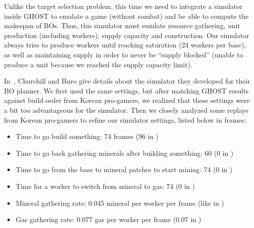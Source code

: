 \documentclass[journal]{IEEEtran}
\newcommand{\ghost}{\textsc{GHOST}\xspace}
\newcommand{\ie}{\textit{i.e.}}
\begin{document}
Unlike the target selection problem, this time  we need to integrate
a simulator inside  \ghost to emulate a game (without  combat) and be
able to  compute the  makespan of BOs. Thus,  this simulator
must emulate resource gathering, unit production (including workers),
supply capacity and construction.  Our simulator always tries to
produce workers  until reaching saturation  (24 workers per  base), as
well as  maintaining supply in  order to never be  ``supply blocked'' (unable  to  produce a  unit because  we  reached the  supply
capacity limit).

In~\cite{ChurchillB11},  Churchill and  Buro  give  details about  the
simulator they developed for their BO planner.  We first used
the same  settings, but  after matching  \ghost results  against build
order from Korean pro-gamers, we realized that these settings were a bit too
advantageous for the simulator.  Then we closely analyzed some replays
from Korean pro-gamers to refine  our simulator settings, listed below in frames:
\begin{itemize}
\item Time to go build something: 74 frames (96 in \cite{ChurchillB11})
\item Time to go back  gathering minerals after building something: 60
  (0 in \cite{ChurchillB11})
\item Time to go from the base  to mineral patches to start mining: 74
  (0 in \cite{ChurchillB11})
\item  Time for  a worker  to  switch from  mineral  to gas:  74 (0  in
  \cite{ChurchillB11})
\item Mineral gathering  rate: 0.045 mineral per worker per frame (like in
  \cite{ChurchillB11})
\item  Gas  gathering  rate:  0.077  gas per  worker  per  frame  (0.07 in \cite{ChurchillB11})
\end{itemize}
\end{document}
